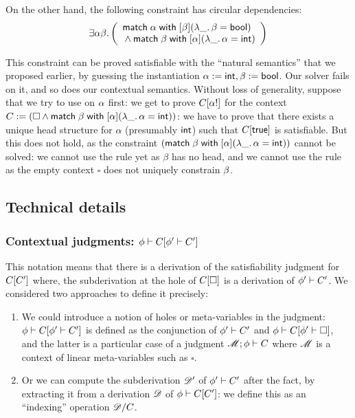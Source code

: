 \documentclass[acmsmall,screen,nonacm]{acmart}
\begin{document}
On the other hand, the following constraint has circular dependencies:
$$
  \exists \alpha \beta.
  \left(\begin{array}{l}
    \mathopen{}\mathrel{\mathsf{match}} \alpha \mathrel{\mathsf{with}} [ \beta ] (\lambda {{\_}}. \,{\beta = \mathsf{bool}}) \\
    {} \wedge \mathopen{}\mathrel{\mathsf{match}} \beta \mathrel{\mathsf{with}} [ \alpha ] (\lambda {{\_}}. \,{\alpha = \mathsf{int}})
  \end{array}\right)
$$

This constraint can be proved satisfiable with the ``natural semantics''
that we proposed earlier, by guessing the instantiation $\alpha := \mathsf{int}, \beta
:= \mathsf{bool}$. Our solver fails on it, and so does our contextual
semantics. Without loss of generality, suppose that we try to use
 on $\alpha$ first: we get to prove $C[\alpha !]$ for the
context $C := (\square \wedge \mathopen{}\mathrel{\mathsf{match}} \beta \mathrel{\mathsf{with}} [ \alpha ] (\lambda {{\_}}. \,{\alpha =
\mathsf{int}}))$: we have to prove that there exists a unique head structure for
$\alpha$ (presumably $\mathsf{int}$) such that $C[\mathsf{true}]$ is satisfiable. But
this does not hold, as the constraint $(\mathopen{}\mathrel{\mathsf{match}} \beta \mathrel{\mathsf{with}} [ \alpha ] (\lambda {{\_}}. \,{\alpha = \mathsf{int}}))$ cannot be solved: we cannot use the  rule
yet as $\beta$ has no head, and we cannot use the  rule as
the empty context $\square$ does not uniquely constrain $\beta$.

\subsection{Technical details}

\subsubsection{Contextual judgments: $\phi \vdash C[\phi' \vdash C']$}\label{par:contextual-judgments} 

This notation means that there is a derivation of the satisfiability
judgment for $C[C']$ where, the subderivation at the hole of
$C[\square]$ is a derivation of $\phi' \vdash C'$. We considered
two approaches to define it precisely:
\begin{enumerate}
\item We could introduce a notion of holes or meta-variables in the
  judgment: $\phi \vdash C[\phi' \vdash C']$ is defined as the
  conjunction of $\phi' \vdash C'$ and
  $\phi \vdash C[\phi' \vdash \square]$, and the latter is
  a particular case of a judgment $\mathscr{M}; \phi \vdash C$
  where $\mathscr{M}$ is a context of linear meta-variables such as
  $\square$.
\item Or we can compute the subderivation $\mathscr{D}'$ of
  $\phi' \vdash C'$ after the fact, by extracting it from
  a derivation $\mathscr{D}$ of $\phi \vdash C[C']$: we define this as
  an ``indexing'' operation ${\mathscr{D}}/{C}$.
\end{enumerate}
\end{document}
